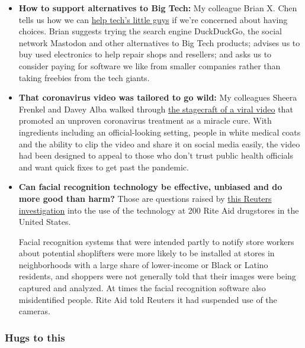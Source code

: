 \begin{itemize}
\item
  \textbf{How to support alternatives to Big Tech:} My colleague Brian
  X. Chen tells us how we can
  \href{https://www.nytimes3xbfgragh.onion/2020/07/29/technology/personaltech/big-tech-power-how-to-fight.html}{help
  tech's little guys} if we're concerned about having choices. Brian
  suggests trying the search engine DuckDuckGo, the social network
  Mastodon and other alternatives to Big Tech products; advises us to
  buy used electronics to help repair shops and resellers; and asks us
  to consider paying for software we like from smaller companies rather
  than taking freebies from the tech giants.
\item
  \textbf{That coronavirus video was tailored to go wild:} My colleagues
  Sheera Frenkel and Davey Alba walked through
  \href{https://www.nytimes3xbfgragh.onion/2020/07/28/technology/virus-video-trump.html}{the
  stagecraft of a viral video} that promoted an unproven coronavirus
  treatment as a miracle cure. With ingredients including an
  official-looking setting, people in white medical coats and the
  ability to clip the video and share it on social media easily, the
  video had been designed to appeal to those who don't trust public
  health officials and want quick fixes to get past the pandemic.
\item
  \textbf{Can facial recognition technology be effective, unbiased and
  do more good than harm?} Those are questions raised by
  \href{https://www.reuters.com/investigates/special-report/usa-riteaid-software/}{this
  Reuters investigation} into the use of the technology at 200 Rite Aid
  drugstores in the United States.

  Facial recognition systems that were intended partly to notify store
  workers about potential shoplifters were more likely to be installed
  at stores in neighborhoods with a large share of lower-income or Black
  or Latino residents, and shoppers were not generally told that their
  images were being captured and analyzed. At times the facial
  recognition software also misidentified people. Rite Aid told Reuters
  it had suspended use of the cameras.
\end{itemize}

\hypertarget{hugs-to-this}{%
\subsubsection{Hugs to this}\label{hugs-to-this}}

